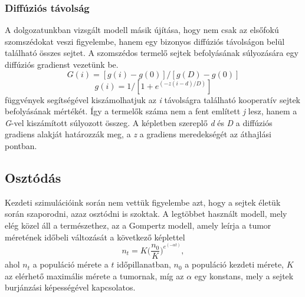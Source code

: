 \subsubsection{Diffúziós távolság}
A dolgozatunkban vizsgált modell másik újítása, hogy nem csak az elsőfokú szomszédokat veszi figyelembe, hanem egy bizonyos diffúziós távolságon belül található összes sejtet. A szomszédos termelő sejtek befolyásának súlyozására egy diffúziós gradienst vezetünk be. 
\begin{equation}
G(i) = [g(i) - g(0)]/[g(D) - g(0)] 
\end{equation}
\begin{equation}
g(i) = 1/[1 + e^{(-z(i-d)/D)}]
\end{equation}
függvények segítségével kiszámolhatjuk az \textit{i} távolságra található kooperatív sejtek befolyásának mértékét. Így a termelők száma nem a fent említett \textit{j} lesz, hanem a \textit{G}-vel kiszámított súlyozott összeg. A képletben szereplő \textit{d} és \textit{D} a diffúziós gradiens alakját határozzák meg, a \textit{z} a gradiens meredekségét az áthajlási pontban\cite{archetti2016cooperation}.

\subsection{Osztódás}
Kezdeti szimulációink során nem vettük figyelembe azt, hogy a sejtek életük során szaporodni, azaz osztódni is szoktak. A legtöbbet használt modell, mely elég közel áll a természethez, az a Gompertz modell, amely leírja a tumor méretének időbeli változását a következő képlettel
\begin{equation}
	n_t = K \bigg(\frac{n_0}{K} \bigg) ^ {e^{(- \alpha t)}},
\end{equation}
ahol $n_t$ a populáció mérete a $t$ időpillanatban, $n_0$ a populáció kezdeti mérete, $K$ az elérhető maximális mérete a tumornak, míg az $\alpha$ egy konstans, mely a sejtek burjánzási képességével kapcsolatos\cite{wiki:gompertz}.